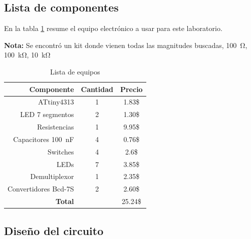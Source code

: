 \subsection*{Lista de componentes}
En la tabla \ref{table_2} resume el equipo electrónico a usar para este laboratorio.\par \textbf{Nota:} Se encontró un kit donde vienen todas las magnitudes buscadas, \SI{100}{\ohm}, \SI{100}{\kilo\ohm}, \SI{10}{\kilo\ohm}
\begin{table}[H]
\caption{Lista de equipos}
\label{table_2}
\begin{center}
\begin{tabular}{r|cc}
\hline
\textbf{Componente}&\textbf{Cantidad}&\textbf{Precio}\\
 \hline
ATtiny4313 &1  & 1.83\$ \\ \hline 
LED 7 segmentos& 2 &1.30\$ \\ \hline 
Resistencias & 1 &9.95\$ \\ \hline

Capacitores \SI{100}{\nano\farad}& 4 & 0.76\$ \\ \hline
Switches & 4 & 2.6\$ \\ \hline
LEDs& 7 & 3.85\$ \\ \hline
Demultiplexor& 1 & 2.35\$ \\ \hline
Convertidores Bcd-7S& 2 &2.60\$ \\ \hline
 \textbf{Total}& & 25.24\$ \\
 \hline
\end{tabular}
\end{center}
\end{table}

\subsection*{Diseño del circuito}

